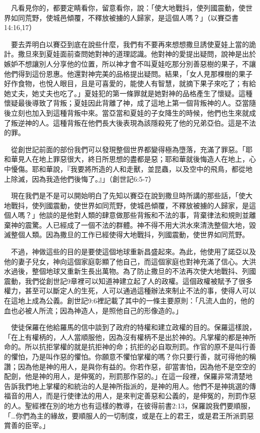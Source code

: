 \documentclass{book}
\begin{document}
　凡看見你的，都要定睛看你，留意看你，說：「使大地戰抖，使列國震動，使世界如同荒野，使城邑傾覆，不釋放被擄的人歸家，是這個人嗎？」（以賽亞書14:16,17）

　要去弄明白以賽亞到底在說些什麼，我們有不要再來想想撒旦誘使夏娃上當的詭計。撒旦來到夏娃面前查問她對神的道理認識。他對神的愛提出疑問，說神是出於嫉妒不想讓別人分享他的位置，所以神才會不叫夏娃吃那分別善惡樹的果子，不讓他們得到這份恩惠。他還對神完美的品格提出疑問。結果，「女人見那棵樹的果子好作食物，也悅人眼目，且是可喜愛的，能使人有智慧，就摘下果子來吃了；有給她丈夫，她丈夫也吃了。」夏娃犯的第一條罪就是她對神的品格產生了懷疑。這種懷疑最後導致了背叛；夏娃因此背離了神，成了這地上第一個背叛神的人。亞當隨後立刻也加入到這種背叛中來。當亞當和夏娃的子女降生的時候，他們也生來就成了叛逆神的人。這種背叛在他們長大後表現為該隱殺死了他的兄弟亞伯。這是不法的罪。

　從創世記前面的部份我們可以發現整個世界都變得極為墮落，充滿了罪惡。「耶和華見人在地上罪惡很大，終日所思想的盡都是惡；耶和華就後悔造人在地上，心中懮傷。耶和華說，『我要將所造的人和走獸，並昆蟲，以及空中的飛鳥，都從地上除滅，因為我造他們後悔了。』」（創世記6:5-7）

　現在我們是不是可以開始明白了先知以賽亞在說到撒旦時所講的那些話，「使大地戰抖，使列國震動，使世界如同荒野，使城邑傾覆，不釋放被擄的人歸家，是這個人嗎？」他談的是他對人類的肆意做那些背叛和不法的事，背棄律法和規則並離棄神的震驚。人已經成了一個不法的群體。神不得不用大洪水來清洗整個大地，毀滅整個人類。因為撒旦的工作已經使得大地戰抖，列國震動，使世界如同荒野。

　不過，神做這些的目的是要使這個地球重新昌盛起來。為此，他使用了諾亞以及他的妻子兒女，神向這個家庭彰顯了他自己，而這個家庭也對神充滿了信心。大洪水過後，整個地球又重新生長出萬物。為了防止撒旦的不法再次使大地戰抖、列國震動，我們從創世記9章裡可以知道神建立起了人的政權。這個政權被賦予了很多權力，甚至可以斷定人的生死，人可以通過這種辦法來制止不法的事，使得人可以在這地上成為公義。創世記9:6裡記載了其中的一條主要原則：「凡流人血的，他的血也必被人所流；因為神造人，是照他自己的形像造的。」

　使徒保羅在他給羅馬的信中談到了政府的特權和建立政權的目的。保羅這樣說，「在上有權柄的，人人當順服他，因為沒有權柄不是出於神的。凡掌權的都是神所命的。所以抗拒掌權的就是抗拒神的命；抗拒的必自取刑罰。作官的原不是叫行善的懼怕，乃是叫作惡的懼怕。你願意不懼怕掌權的嗎？你只要行善，就可得他的稱讚；因為他是神的用人，是與你有益的。你若作惡，卻當害怕，因為他不是空空的配劍，他是神的用人，是伸冤的，刑罰那作惡的。」在這一段裡，保羅非常清楚地告訴我們地上掌權的和統治的人是神所指派的，是神的用人。他們不是神挑選的傳福音的用人，而是行使律法的用人，是來判定善惡和公義的，是伸冤的，刑罰作惡的人。聖經裡在別的地方也有這樣的教導，在彼得前書2:13，保羅說我們要順服，「…你們為主的緣故，要順服人的一切制度，或是在上的君王，或是君王所派罰惡賞善的臣宰。」
\end{document}
